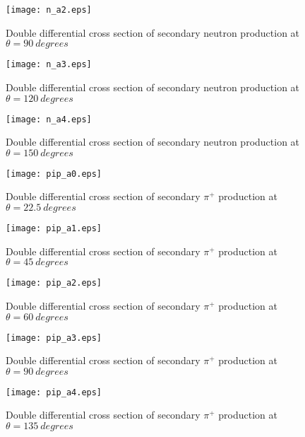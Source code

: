 \documentclass[12pt]{article}
\begin{document}
\begin{figure}[htbp]
\caption{Double differential cross section of secondary neutron production at $\theta = 90~degrees$}
\label{figa2} 
\centerline{\texttt{[image: n\_a2.eps]}}
\end{figure}

\begin{figure}[htbp]
\caption{Double differential cross section of secondary neutron production at $\theta = 120~degrees$}
\label{figa3} 
\centerline{\texttt{[image: n\_a3.eps]}}
\end{figure}

\begin{figure}[htbp]
\caption{Double differential cross section of secondary neutron production at $\theta = 150~degrees$}
\label{figa4} 
\centerline{\texttt{[image: n\_a4.eps]}}
\end{figure}

\clearpage

\begin{figure}[htbp]
\caption{Double differential cross section of secondary $\pi^+$ production at $\theta = 22.5~degrees$}
\label{figpip0} 
\centerline{\texttt{[image: pip\_a0.eps]}}
\end{figure}


\begin{figure}[htbp]
\caption{Double differential cross section of secondary $\pi^+$ production at $\theta = 45~degrees$}
\label{figpip1} 
\centerline{\texttt{[image: pip\_a1.eps]}}
\end{figure}

\begin{figure}[htbp]
\caption{Double differential cross section of secondary $\pi^+$ production at $\theta = 60~degrees$}
\label{figpip2} 
\centerline{\texttt{[image: pip\_a2.eps]}}
\end{figure}

\begin{figure}[htbp]
\caption{Double differential cross section of secondary $\pi^+$ production at $\theta = 90~degrees$}
\label{figpip3} 
\centerline{\texttt{[image: pip\_a3.eps]}}
\end{figure}

\begin{figure}[htbp]
\caption{Double differential cross section of secondary $\pi^+$ production at $\theta = 135~degrees$}
\label{figpip4} 
\centerline{\texttt{[image: pip\_a4.eps]}}
\end{figure}
\end{document}
